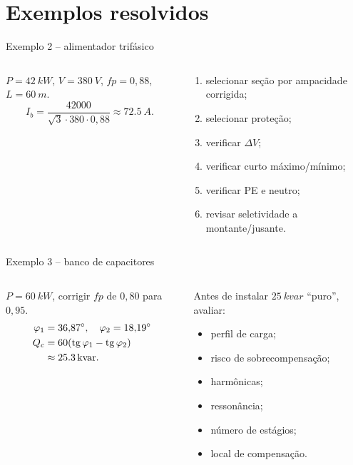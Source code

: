 \section{Exemplos resolvidos}

\begin{frame}{Exemplo 2 -- alimentador trifásico}
\small
\begin{columns}[T,onlytextwidth]
\begin{caixaEx}
$P=\SI{42}{kW}$, $V=\SI{380}{V}$, $fp=0{,}88$, $L=\SI{60}{m}$.
\[
I_b=\frac{42000}{\sqrt3\cdot380\cdot0{,}88}\approx\SI{72.5}{A}.
\]
\end{caixaEx}
\begin{caixaProjeto}[title=Sequência]
\begin{enumerate}
\item selecionar seção por ampacidade corrigida;
\item selecionar proteção;
\item verificar $\Delta V$;
\item verificar curto máximo/mínimo;
\item verificar PE e neutro;
\item revisar seletividade a montante/jusante.
\end{enumerate}
\end{caixaProjeto}
\end{columns}
\end{frame}
\begin{frame}{Exemplo 3 -- banco de capacitores}
\small
\begin{columns}[T,onlytextwidth]
\begin{caixaEx}
$P=\SI{60}{kW}$, corrigir $fp$ de $0{,}80$ para $0{,}95$.
\begin{align*}
\varphi_1&=36{,}87^\circ,\quad \varphi_2=18{,}19^\circ\\
Q_c&=60(\operatorname{tg}\varphi_1-\operatorname{tg}\varphi_2)\\
&\approx\SI{25.3}{kvar}.
\end{align*}
\end{caixaEx}
\begin{caixaAt}
Antes de instalar $\SI{25}{kvar}$ ``puro'', avaliar:
\begin{itemize}
\item perfil de carga;
\item risco de sobrecompensação;
\item harmônicas;
\item ressonância;
\item número de estágios;
\item local de compensação.
\end{itemize}
\end{caixaAt}
\end{columns}
\end{frame}
